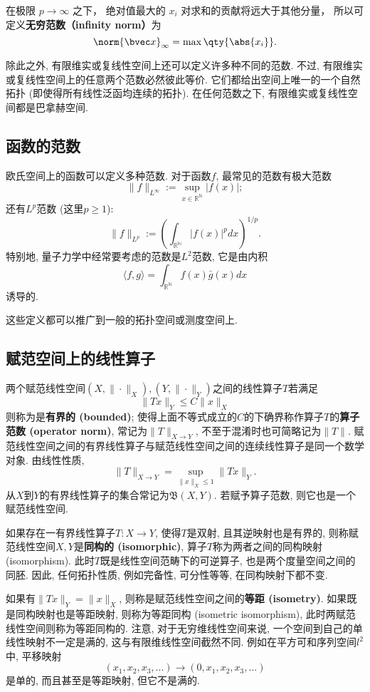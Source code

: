 在极限 $p \to \infty$ 之下， 绝对值最大的 $x_i$ 对求和的贡献将远大于其他分量， 所以可定义\textbf{无穷范数（infinity norm）}为
\begin{equation}
\norm{\bvec x}_\infty = \max \qty{\abs{x_i}}.
\end{equation}

除此之外, 有限维实或复线性空间上还可以定义许多种不同的范数. 不过, 有限维实或复线性空间上的任意两个范数必然彼此等价. 它们都给出空间上唯一的一个自然拓扑 (即使得所有线性泛函均连续的拓扑). 在任何范数之下, 有限维实或复线性空间都是巴拿赫空间.

\subsection{函数的范数}
欧氏空间上的函数可以定义多种范数. 对于函数$f$, 最常见的范数有极大范数
$$
\|f\|_{L^\infty}:=\sup_{x\in\mathbb{R^N}}|f(x)|;
$$
还有$L^p$范数 (这里$p\geq1$):
$$
\|f\|_{L^p}:=\left(\int_{\mathbb{R^N}}|f(x)|^pdx\right)^{1/p}.
$$
特别地, 量子力学中经常要考虑的范数是$L^2$范数, 它是由内积
$$
\langle f,g\rangle=\int_{\mathbb{R^N}}f(x)\bar g(x)dx
$$
诱导的.

这些定义都可以推广到一般的拓扑空间或测度空间上.

\subsection{赋范空间上的线性算子}
两个赋范线性空间$(X,\|\cdot\|_X),(Y,\|\cdot\|_Y)$之间的线性算子$T$若满足
$$
\|Tx\|_Y\leq C\|x\|_X
$$
则称为是\textbf{有界的 (bounded)}; 使得上面不等式成立的$C$的下确界称作算子$T$的\textbf{算子范数 (operator norm)}, 常记为$\|T\|_{X\to Y}$, 不至于混淆时也可简略记为$\|T\|$. 赋范线性空间之间的有界线性算子与赋范线性空间之间的连续线性算子是同一个数学对象. 由线性性质,
$$
\|T\|_{X\to Y}=\sup_{\|x\|_X\leq 1}\|Tx\|_Y.
$$
从$X$到$Y$的有界线性算子的集合常记为$\mathfrak{B}(X,Y)$. 若赋予算子范数, 则它也是一个赋范线性空间.

如果存在一有界线性算子$T:X\to Y$, 使得$T$是双射, 且其逆映射也是有界的, 则称赋范线性空间$X,Y$是\textbf{同构的 (isomorphic)}, 算子$T$称为两者之间的同构映射 (isomorphism). 此时$T$既是线性空间范畴下的可逆算子, 也是两个度量空间之间的同胚. 因此, 任何拓扑性质, 例如完备性, 可分性等等, 在同构映射下都不变. 

如果有$\|Tx\|_Y=\|x\|_X$, 则称是赋范线性空间之间的\textbf{等距 (isometry)}. 如果既是同构映射也是等距映射, 则称为等距同构 (isometric isomorphism), 此时两赋范线性空间则称为等距同构的. 注意, 对于无穷维线性空间来说, 一个空间到自己的单线性映射不一定是满的, 这与有限维线性空间截然不同. 例如在平方可和序列空间$l^2$中, 平移映射
$$
(x_1,x_2,x_3,...)\to(0,x_1,x_2,x_3,...)
$$
是单的, 而且甚至是等距映射, 但它不是满的.

